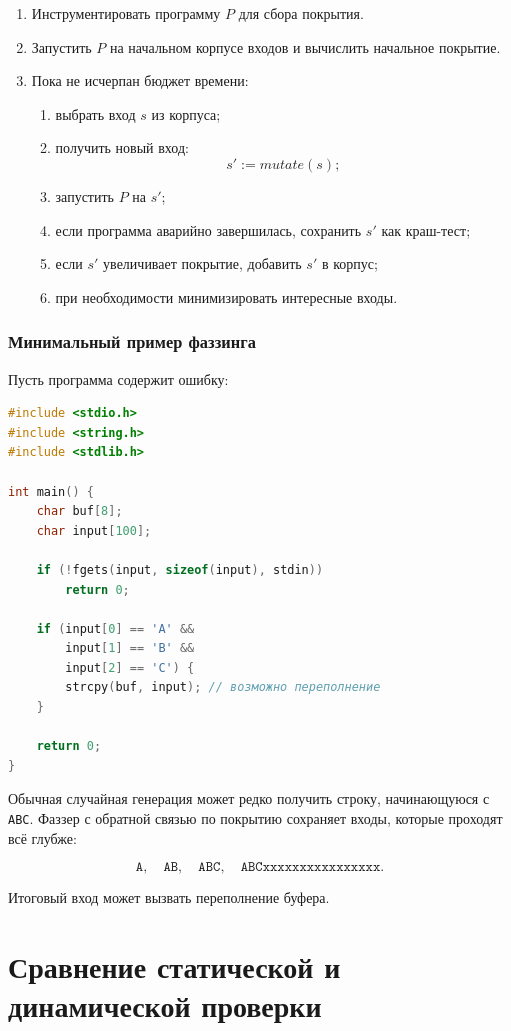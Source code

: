 \documentclass[12pt,a4paper]{article}
\begin{document}
\begin{enumerate}
  \item Инструментировать программу $P$ для сбора покрытия.
  \item Запустить $P$ на начальном корпусе входов и вычислить начальное покрытие.
  \item Пока не исчерпан бюджет времени:
  \begin{enumerate}
    \item выбрать вход $s$ из корпуса;
    \item получить новый вход:
    \[
    s' := mutate(s);
    \]
    \item запустить $P$ на $s'$;
    \item если программа аварийно завершилась, сохранить $s'$ как краш-тест;
    \item если $s'$ увеличивает покрытие, добавить $s'$ в корпус;
    \item при необходимости минимизировать интересные входы.
  \end{enumerate}
\end{enumerate}

\subsubsection{Минимальный пример фаззинга}

Пусть программа содержит ошибку:

\begin{lstlisting}[language=C]
#include <stdio.h>
#include <string.h>
#include <stdlib.h>

int main() {
    char buf[8];
    char input[100];

    if (!fgets(input, sizeof(input), stdin))
        return 0;

    if (input[0] == 'A' &&
        input[1] == 'B' &&
        input[2] == 'C') {
        strcpy(buf, input); // возможно переполнение
    }

    return 0;
}
\end{lstlisting}

Обычная случайная генерация может редко получить строку, начинающуюся с \texttt{ABC}. Фаззер с обратной связью по покрытию сохраняет входы, которые проходят всё глубже:

\[
\texttt{A},
\quad
\texttt{AB},
\quad
\texttt{ABC},
\quad
\texttt{ABCxxxxxxxxxxxxxxxx}.
\]

Итоговый вход может вызвать переполнение буфера.

\section{Сравнение статической и динамической проверки}
\end{document}
